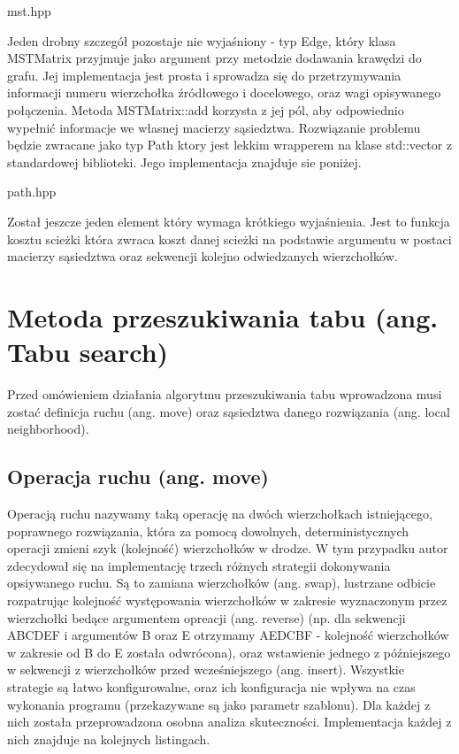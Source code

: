 \documentclass[polish,polish,a4paper]{article}
\begin{document}

{mst.hpp}

Jeden drobny szczegół pozostaje nie wyjaśniony - typ Edge, który klasa MSTMatrix przyjmuje jako argument przy metodzie dodawania krawędzi do grafu.
Jej implementacja jest prosta i sprowadza się do przetrzymywania informacji numeru wierzchołka źródłowego i docelowego, oraz wagi opisywanego połączenia.
Metoda MSTMatrix::add korzysta z jej pól, aby odpowiednio wypełnić informacje we własnej macierzy sąsiedztwa.
Rozwiązanie problemu będzie zwracane jako typ Path ktory jest lekkim wrapperem na klase std::vector z standardowej biblioteki.
Jego implementacja znajduje sie poniżej.


{path.hpp}

Został jeszcze jeden element który wymaga krótkiego wyjaśnienia. Jest to funkcja kosztu scieżki która zwraca koszt danej scieżki na podstawie argumentu w postaci macierzy sąsiedztwa
oraz sekwencji kolejno odwiedzanych wierzchołków.

\section{Metoda przeszukiwania tabu (ang. Tabu search)}

Przed omówieniem działania algorytmu przeszukiwania tabu wprowadzona musi zostać definicja ruchu (ang. move) oraz
sąsiedztwa danego rozwiązania (ang. local neighborhood).

\subsection{Operacja ruchu (ang. move)}
Operacją ruchu nazywamy taką operację na dwóch wierzchołkach istniejącego, poprawnego rozwiązania, która za pomocą dowolnych,
deterministycznych operacji zmieni szyk (kolejność) wierzchołków w drodze. W tym przypadku autor zdecydował się na implementację
trzech różnych strategii dokonywania opsiywanego ruchu. Są to zamiana wierzchołków (ang. swap), lustrzane odbicie rozpatrując 
kolejność występowania wierzchołków w zakresie wyznaczonym przez wierzchołki bedące argumentem opreacji (ang. reverse) (np.
dla sekwencji ABCDEF i argumentów B oraz E otrzymamy AEDCBF - kolejność wierzchołków w zakresie od B do E została odwrócona),
oraz wstawienie jednego z późniejszego w sekwencji z wierzchołków przed wcześniejszego (ang. insert). Wszystkie strategie są
łatwo konfigurowalne, oraz ich konfiguracja nie wpływa na czas wykonania programu (przekazywane są jako parametr szablonu).
Dla każdej z nich została przeprowadzona osobna analiza skuteczności. Implementacja każdej z nich znajduje na kolejnych listingach.
\end{document}
